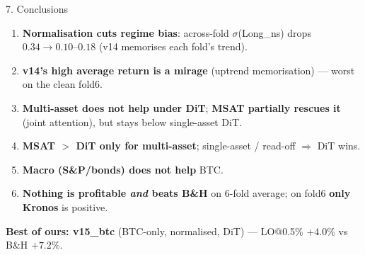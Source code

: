 \documentclass[aspectratio=169]{beamer}
\begin{document}
\begin{frame}{7. Conclusions}
\small
\begin{enumerate}
\item \textbf{Normalisation cuts regime bias}: across-fold $\sigma$(Long\_ns) drops $0.34\to0.10$--$0.18$ (v14 memorises each fold's trend).
\item \textbf{v14's high average return is a mirage} (uptrend memorisation) --- worst on the clean fold6.
\item \textbf{Multi-asset does not help under DiT}; \textbf{MSAT partially rescues it} (joint attention), but stays below single-asset DiT.
\item \textbf{MSAT $>$ DiT only for multi-asset}; single-asset / read-off $\Rightarrow$ DiT wins.
\item \textbf{Macro (S\&P/bonds) does not help} BTC.
\item \textbf{Nothing is profitable \emph{and} beats B\&H} on 6-fold average; on fold6 \textbf{only Kronos} is positive.
\end{enumerate}
\vspace{.5ex}
\textbf{Best of ours: v15\_btc} (BTC-only, normalised, DiT) --- LO@0.5\% $+4.0\%$ vs B\&H $+7.2\%$.
\end{frame}
\end{document}
